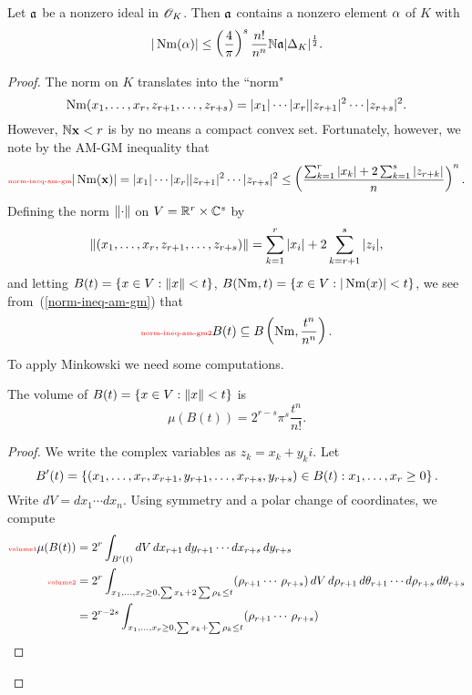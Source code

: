 \begin{thm}
Let $\mathfrak{a}$ be a nonzero ideal in $\mathscr{O}_K$. Then $\mathfrak{a}$ contains a nonzero element $\alpha$ of $K$ with 
\[
|\nm(\al)|\le %
\pf{4}{\pi}^s \frac{n!}{n^n} \N\ma |\De_K|^{\rc 2}.
\]
\end{thm}
\begin{proof}
The norm on $K$ translates into the ``norm" 
\[\operatorname{Nm}(x_1,\ldots, x_r,z_{r+1},\ldots, z_{r+s})=|x_1|\cdots |x_r||z_{r+1}|^2\cdots|z_{r+s}|^2.\] However, $\mathbb{N}\mathbf x<r$ is by no means a compact convex set. Fortunately, however, we note by the AM-GM inequality that
\begin{equation}\llabel{norm-ineq-am-gm}
|\nm (\mathbf x)|=|x_1|\cdots |x_r|
|z_{r+1}|^2\cdots|z_{r+s}|^2 \le
\pf{
\sum_{k=1}^r |x_k|+2\sum_{k=1}^s |z_{r+k}|
}{n}^n.
\end{equation}
Defining the norm $\left\Vert {\cdot}\right\Vert$ on $V=\mathbb{R}^r\times \mathbb{C}^s$ by
\[
\left\Vert {(x_1,\ldots,x_r,z_{r+1},\ldots,  z_{r+s})}\right\Vert=\sum_{k=1}^r |x_i|+2\sum_{k=r+1}^s |z_i|,
\]
and letting $B(t)=\left\{{x\in V}:{\left\Vert {x}\right\Vert<t}\right\}$, $B(\operatorname{Nm},t)=\left\{{x\in V}:{|\operatorname{Nm}(x)|<t}\right\}$, we see from~(\ref{norm-ineq-am-gm}) that
\begin{equation}\llabel{norm-ineq-am-gm2}
B(t)\subeq B\pa{\nm,\frac{t^n}{n^n}}.
\end{equation}
To apply Minkowski we need some computations.
\begin{lem}
The volume of $B(t)=\left\{{x\in V}:{\left\Vert {x}\right\Vert<t}\right\}$ is
\[
\mu(B(t))=2^{r-s} \pi^s\frac{t^n}{n!}.
\]
\end{lem}
\begin{proof}
We write the complex variables as $z_k=x_k+y_ki$. 
Let 
\[
B'(t)=\left\{{(x_1,\ldots,x_r,x_{r+1},y_{r+1},\ldots,
x_{r+s},y_{r+s})\in B(t)}:{x_1,\ldots, x_{r}\ge 0}\right\}.\]
Write $dV=dx_1\cdots dx_n$. Using symmetry and a polar change of coordinates, we compute
\begin{align}
\llabel{volume1}\mu(B(t))&=2^{r} \int_{B'(t)}dV\,dx_{r+1}\,dy_{r+1}\cdots dx_{r+s}\,dy_{r+s}\\%
\llabel{volume2}&=2^{r}\int_{x_1,\ldots, x_r\ge 0, \sum x_k+2\sum \rh_k\le t}(\rh_{r+1}\cdots \,\rh_{r+s})\,
dV\,d\rh_{r+1}\,d\theta_{r+1}\cdots d\rh_{r+s}\,d\te_{r+s}\\%
\nonumber &=2^{r-2s} \int_{x_1,\ldots, x_r\ge 0, \sum x_k+\sum \rh_k\le t}(\rh_{r+1}\cdots \,\rh_{r+s})\,

\end{align}
\end{proof}
\end{proof}
